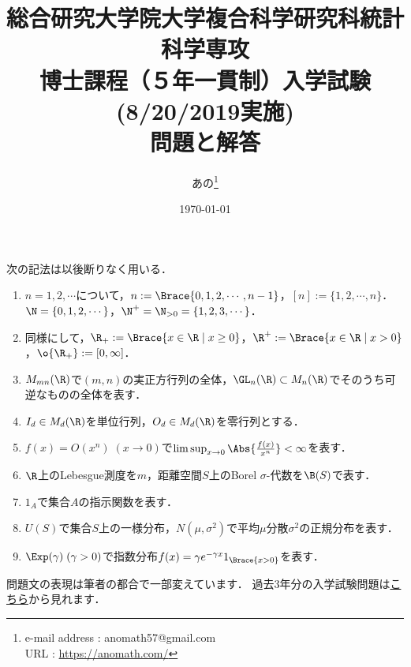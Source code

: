 \documentclass[uplatex,dvipdfmx]{jsarticle}
\title{総合研究大学院大学複合科学研究科統計科学専攻\\
博士課程（５年一貫制）入学試験(8/20/2019実施)\\
問題と解答}
\author{あの\footnote{e-mail address : anomath57@gmail.com\\URL : \url{https://anomath.com/}}}
\date{\today}
\begin{document}
\maketitle

\begin{tcolorbox}[title=記法についての注意]
    次の記法は以後断りなく用いる．
    \begin{enumerate}
        \item $n=1,2,\cdots$について，$n:=\Brace{0,1,2,\cdots,n-1}$，$[n]:=\{1,2,\cdots,n\}$．$\N=\{0,1,2,\cdots\}$，$\N^+=\N_{>0}=\{1,2,3,\cdots\}$．
        \item 同様にして，$\R_+:=\Brace{x\in\R\mid x\ge0}$，$\R^+:=\Brace{x\in\R\mid x>0}$，$\o{\R_+}:=[0,\infty]$．
        \item $M_{mn}(\R)$で$(m,n)$の実正方行列の全体，$\GL_n(\R)\subset M_n(\R)$でそのうち可逆なものの全体を表す．
        \item $I_d\in M_d(\R)$を単位行列，$O_d\in M_d(\R)$を零行列とする．
        \item $f(x)=O(x^n)\;(x\to0)$で$\limsup_{x\to0}\Abs{\frac{f(x)}{x^n}}<\infty$を表す．
        \item $\R$上のLebesgue測度を$m$，距離空間$S$上のBorel $\sigma$-代数を$\B(S)$で表す．
        \item $1_A$で集合$A$の指示関数を表す．
        \item $U(S)$で集合$S$上の一様分布，$N(\mu,\sigma^2)$で平均$\mu$分散$\sigma^2$の正規分布を表す．
        \item $\Exp(\gamma)\;(\gamma>0)$で指数分布$f(x)=\gamma e^{-\gamma x}1_{\Brace{x>0}}$を表す．
    \end{enumerate}
    問題文の表現は筆者の都合で一部変えています．
    過去3年分の入学試験問題は\href{https://www.ism.ac.jp/senkou/admission/kakomon.html}{こちら}から見れます．
\end{tcolorbox}
\end{document}
